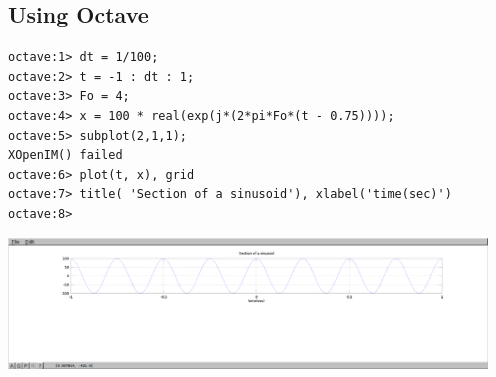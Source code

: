 \documentclass{article}
\begin{document}
\subsection{Using Octave}
\begin{lstlisting}
octave:1> dt = 1/100;
octave:2> t = -1 : dt : 1;
octave:3> Fo = 4;
octave:4> x = 100 * real(exp(j*(2*pi*Fo*(t - 0.75))));
octave:5> subplot(2,1,1);
XOpenIM() failed
octave:6> plot(t, x), grid
octave:7> title( 'Section of a sinusoid'), xlabel('time(sec)')
octave:8> 
\end{lstlisting}
\includegraphics[width=5in]{img_A1_1.png}
\end{document}
